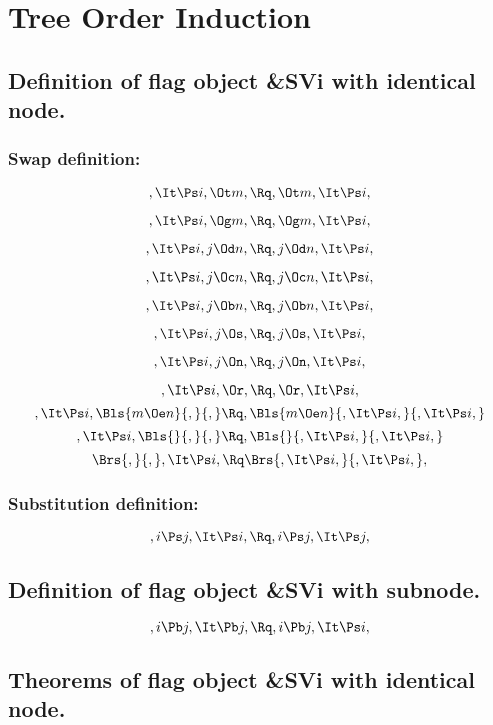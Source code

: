 
\chapter{Tree Order Induction}
\section{Definition of flag object \&SVi with identical node.}



\subsection{Swap definition:}
\[,\It \Ps i, \Ot m, \Rq , \Ot m, \It \Ps i,\]

\[,\It \Ps i, \Og m, \Rq , \Og m, \It \Ps i,\]

\[,\It \Ps i, j \Od n, \Rq , j \Od n, \It \Ps i,\]

\[,\It \Ps i, j \Oc n, \Rq , j \Oc n, \It \Ps i,\]

\[,\It \Ps i, j \Ob n, \Rq , j \Ob n, \It \Ps i,\]

\[,\It \Ps i, j \Os, \Rq , j \Os, \It \Ps i,\]

\[,\It \Ps i, j \On, \Rq , j \On, \It \Ps i,\]

\[,\It \Ps i, \Or, \Rq , \Or, \It \Ps i,\]
\bigskip
\[,\It \Ps i, \Bls{m \Oe n}{,}{,} \Rq , \Bls{m \Oe n}{,\It \Ps i,}{,\It \Ps i,}\]
\bigskip
\[,\It \Ps i, \Bls{}{,}{,} \Rq , \Bls{}{,\It \Ps i,}{,\It \Ps i,}\]
\bigskip
\[ \Brs{,}{,},\It \Ps i, \Rq \Brs{,\It \Ps i,}{,\It \Ps i,},\]



\bigskip
\bigskip
\subsection{Substitution definition:}
\[,i \Ps j, \It \Ps i, \Rq , i\Ps j, \It \Ps j,\]



\bigskip
\bigskip
\bigskip
\bigskip
\section{Definition of flag object \&SVi with subnode.}
\[, i \Pb j, \It \Pb j, \Rq , i \Pb j, \It \Ps i,\]



\bigskip
\bigskip
\bigskip
\bigskip
\section{Theorems of flag object \&SVi with identical node.}
